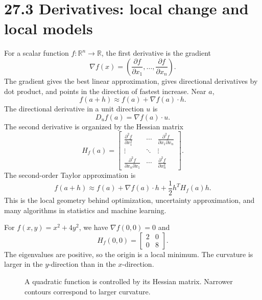 \documentclass[11pt]{article}
\newcommand{\R}{\mathbb R}
\newcommand{\grad}{\nabla}
\begin{document}
\section*{27.3 Derivatives: local change and local models}

For a scalar function $f:\R^n\to\R$, the first derivative is the gradient
\[
\grad f(x)=\left(\frac{\partial f}{\partial x_1},\ldots,\frac{\partial f}{\partial x_n}\right).
\]
The gradient gives the best linear approximation, gives directional derivatives by dot product, and points in the direction of fastest increase. Near $a$,
\[
f(a+h)\approx f(a)+\grad f(a)\cdot h.
\]
The directional derivative in a unit direction $u$ is
\[
D_u f(a)=\grad f(a)\cdot u.
\]
The second derivative is organized by the Hessian matrix
\[
H_f(a)=
\begin{bmatrix}
\frac{\partial^2 f}{\partial x_1^2} & \cdots & \frac{\partial^2 f}{\partial x_1\partial x_n} \\
\vdots & \ddots & \vdots \\
\frac{\partial^2 f}{\partial x_n\partial x_1} & \cdots & \frac{\partial^2 f}{\partial x_n^2}
\end{bmatrix}.
\]
The second-order Taylor approximation is
\[
f(a+h)\approx f(a)+\grad f(a)\cdot h+\frac12 h^T H_f(a)h.
\]
This is the local geometry behind optimization, uncertainty approximation, and many algorithms in statistics and machine learning.

\begin{examplebox}
For $f(x,y)=x^2+4y^2$, we have $\grad f(0,0)=0$ and
\[
H_f(0,0)=\begin{bmatrix}2&0\\0&8\end{bmatrix}.
\]
The eigenvalues are positive, so the origin is a local minimum. The curvature is larger in the $y$-direction than in the $x$-direction.
\end{examplebox}

\begin{figure}[H]
\centering
{}
\caption{A quadratic function is controlled by its Hessian matrix. Narrower contours correspond to larger curvature.}
\end{figure}
\end{document}
